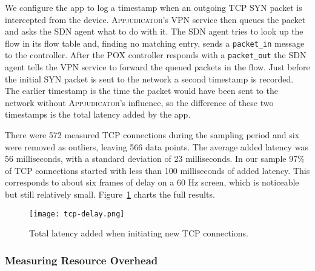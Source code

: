 We configure the app to log a timestamp when an outgoing TCP SYN packet is
intercepted from the device. \textsc{Appjudicator}'s VPN service then queues the
packet and asks the SDN agent what to do with it. The SDN agent tries to look up
the flow in its flow table and, finding no matching entry, sends a
\texttt{packet\_in} message to the controller. After the POX controller responds
with a \texttt{packet\_out} the SDN agent tells the VPN service to forward the
queued packets in the flow. Just before the initial SYN packet is sent to the
network a second timestamp is recorded. The earlier timestamp is the time the
packet would have been sent to the network without \textsc{Appjudicator}'s
influence, so the difference of these two timestamps is the total latency added
by the app.

There were 572 measured TCP connections during the sampling period and six were
removed as outliers, leaving 566 data points. The average added latency was 56
milliseconds, with a standard deviation of 23 milliseconds. In our sample 97\%
of TCP connections started with less than 100 milliseconds of added latency.
This corresponds to about six frames of delay on a 60 Hz screen, which is
noticeable but still relatively small. Figure~\ref{fig:tcp-delay-chart} charts
the full results.

\begin{figure}[h]
    \centering
    \texttt{[image: tcp-delay.png]}
    \caption{Total latency added when initiating new TCP connections.}
	\label{fig:tcp-delay-chart}
\end{figure}

\subsubsection{Measuring Resource Overhead}
\label{sec:measuring-resource-overhead}


\newpage
